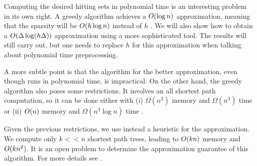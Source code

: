 Computing the desired hitting sets in polynomial time is an interesting problem in its own right.
A greedy algorithm achieves a $O(\log n)$ approximation, meaning that the sparsity will be $O(h\log n)$ instead of $h$ .
We will also show how to obtain a $O(\Delta\log(h\Delta))$ approximation using a more sophisticated tool.
The results will still carry out, but one needs to replace $h$ for this approximation when talking about polynomial time preprocessing.

A more subtle point is that the algorithm for the better approximation, even though runs in polynomial time, is impractical.
On the other hand, the greedy algorithm also poses some restrictions.
It involves an all shortest path computation, so it can be done either with (i) $\Omega(n^2)$ memory and $\Omega(n^3)$ time or (ii) $O(n)$ memory and $\Omega(n^3\log n)$ time . 

Given the previous restrictions, we use instead a heuristic for the approximation.
We compute only $k<<n$ shortest path trees, leading to $O(kn)$ memory and $O(kn^2)$.
It is an open problem to determine the approximation guarantee of this algorithm.
For more details see .
